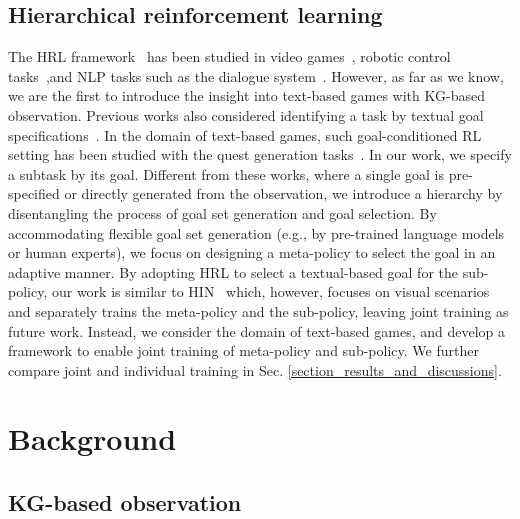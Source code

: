 \documentclass[11pt]{article}
\begin{document}
\subsection{Hierarchical reinforcement learning}
The HRL framework~\cite{dayan1992hrl_feudal} has been studied in video games~\cite{kulkarni2016hrl, vezhnevets2017hrl_feudal, shu2018hrl}, robotic control tasks~\cite{nachum2018hrl},and NLP tasks such as the dialogue system~\cite{peng2017HRLforDialogue,saleh2020HRLforDialogue}. 
However, as far as we know, we are the first to introduce the insight into text-based games with KG-based observation.  
Previous works also considered identifying a task by textual goal specifications~\cite{bahdanau2018goal_language,fu2018goal_language}.
In the domain of text-based games, such goal-conditioned RL setting has been studied with the quest generation tasks~\cite{ammanabrolu2019quest,ammanabrolu2020quest}. In our work, we specify a subtask by its goal. 
Different from these works, where a single goal is pre-specified or directly generated from the observation, we introduce a hierarchy by disentangling the process of goal set generation and goal selection. 
By accommodating flexible goal set generation (e.g., by pre-trained language models or human experts), we focus on designing a meta-policy to select the goal in an adaptive manner.  
By adopting HRL to select a textual-based goal for the sub-policy, our work is similar to HIN~\cite{jiang2019hrl} which, however, focuses on visual scenarios and separately trains the meta-policy and the sub-policy, leaving joint training as future work. 
Instead, we consider the domain of text-based games, and develop a framework to enable joint training of meta-policy and sub-policy. 
We further compare joint and individual training in Sec.  \ref{section_results_and_discussions}. 


\section{Background}

\subsection{KG-based observation}
\end{document}
